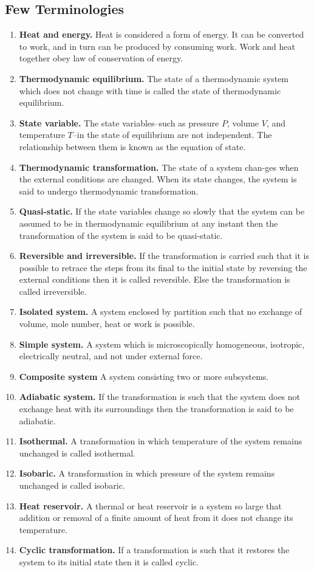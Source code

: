 \documentclass[../../../Main.tex]{subfiles}
\begin{document}
\subsection*{Few Terminologies}
\begin{enumerate}
    \item \textbf{Heat and energy.} Heat is considered a form of energy. It can be converted to work, and in turn can be produced by consuming work. Work and heat together obey law of conservation of energy.
    \item \textbf{Thermodynamic equilibrium.} The state of a thermodynamic system which does not change with time is called the state of thermodynamic equilibrium.
    \item \textbf{State variable.} The state variables--such as pressure $P$, volume $V$, and temperature $T$--in the state of equilibrium are not independent. The relationship between them is known as the equation of state.
    \item \textbf{Thermodynamic transformation.} The state of a system chan-ges when the external conditions are changed. When its state changes, the system is said to undergo thermodynamic transformation.
    \item \textbf{Quasi-static.} If the state variables change so slowly that the system can be assumed to be in thermodynamic equilibrium at any instant then the transformation of the system is said to be quasi-static.
    \item \textbf{Reversible and irreversible.} If the transformation is carried such that it is possible to retrace the steps from its final to the initial state by reversing the external conditions then it is called reversible. Else the transformation is called irreversible.
    \item \textbf{Isolated system.} A system enclosed by partition such that no exchange of volume, mole number, heat or work is possible.
    \item \textbf{Simple system.} A system which is microscopically homogeneous, isotropic, electrically neutral, and not under external force.
    \item \textbf{Composite system} A system consisting two or more subsystems.
    \item \textbf{Adiabatic system.} If the transformation is such that the system does not exchange heat with its surroundings then the transformation is said to be adiabatic.
    \item \textbf{Isothermal.} A transformation in which temperature of the system remains unchanged is called isothermal.
    \item \textbf{Isobaric.} A transformation in which pressure of the system remains unchanged is called
    isobaric.
    \item \textbf{Heat reservoir.} A thermal or heat reservoir is a system so large that addition or removal of a finite amount of heat from it does not change its temperature.
    \item \textbf{Cyclic transformation.} If a transformation is such that it restores the system to its initial state then it is called cyclic. 
\end{enumerate}
\end{document}
